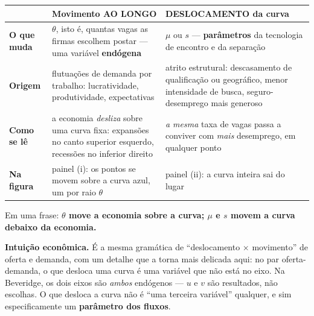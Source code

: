 \documentclass[11pt, a4paper]{article}
\newcommand{\intuicao}[1]{%
  \medskip\noindent\textcolor{midblue}{\textbf{Intuição econômica.}} #1\par}
\begin{document}
\begin{tcolorbox}[theorybox, title={Deslocamento contra movimento ao longo --- a distinção que o item cobra}]
\small
\renewcommand{\arraystretch}{1.35}
\begin{tabular}{@{}p{3.1cm}p{5.1cm}p{5.6cm}@{}}
\toprule
& \textbf{Movimento AO LONGO} & \textbf{DESLOCAMENTO da curva} \\
\midrule
\textbf{O que muda} & $\theta$, isto é, quantas vagas as firmas escolhem postar --- uma
  variável \textbf{endógena} & $\mu$ ou $s$ --- \textbf{parâmetros} da tecnologia de
  encontro e da separação \\
\textbf{Origem} & flutuações de demanda por trabalho: lucratividade, produtividade,
  expectativas & atrito estrutural: descasamento de qualificação ou geográfico, menor
  intensidade de busca, seguro-desemprego mais generoso \\
\textbf{Como se lê} & a economia \emph{desliza} sobre uma curva fixa: expansões no canto
  superior esquerdo, recessões no inferior direito & \emph{a mesma} taxa de vagas passa a
  conviver com \emph{mais} desemprego, em qualquer ponto \\
\textbf{Na figura} & painel (i): os pontos se movem sobre a curva azul, um por raio
  $\theta$ & painel (ii): a curva inteira sai do lugar \\
\bottomrule
\end{tabular}

\smallskip
Em uma frase: \textbf{$\theta$ move a economia sobre a curva; $\mu$ e $s$ movem a curva
debaixo da economia.}
\end{tcolorbox}

\intuicao{É a mesma gramática de ``deslocamento $\times$ movimento'' de oferta e demanda,
com um detalhe que a torna mais delicada aqui: no par oferta-demanda, o que desloca uma
curva é uma variável que não está no eixo. Na Beveridge, os dois eixos são \emph{ambos}
endógenos --- $u$ e $v$ são resultados, não escolhas. O que desloca a curva não é ``uma
terceira variável'' qualquer, e sim especificamente um \textbf{parâmetro dos fluxos}.}
\end{document}
